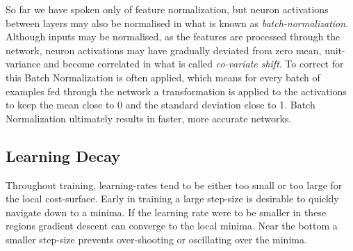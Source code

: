So far we have spoken only of feature normalization, but neuron activations between layers may also be normalised in what is known as \textit{batch-normalization}.
Although inputs may be normalised, as the features are processed through the network, neuron activations may have gradually deviated from zero mean, unit-variance and become correlated in what is called \textit{co-variate shift}.
To correct for this Batch Normalization is often applied, which means for every batch of examples fed through the network a transformation is applied to the activations to keep the mean close to 0 and the standard deviation close to 1.
Batch Normalization ultimately results in faster, more accurate networks\citep{ioffe2015batch}.

\subsection{Learning Decay}
Throughout training, learning-rates tend to be either too small or too large for the local cost-surface.
Early in training a large step-size is desirable to quickly navigate down to a minima.
If the learning rate were to be smaller in these regions gradient descent can converge to the local minima.
Near the bottom a smaller step-size prevents over-shooting or oscillating over the minima.

